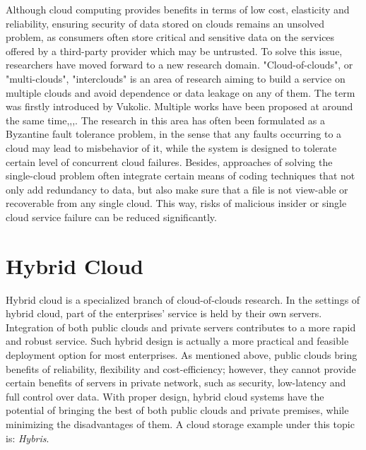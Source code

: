 Although cloud computing provides benefits in terms of low cost, elasticity and reliability, ensuring security of data stored on clouds remains an unsolved problem, as consumers often store critical and sensitive data on the services offered by a third-party provider which may be untrusted. To solve this issue, researchers have moved forward to  a new research domain\cite{aizain2012multiclouds}. "Cloud-of-clouds", or "multi-clouds", "interclouds" is an area of research aiming to build a service on multiple clouds and avoid dependence or data leakage on any of them. The term was firstly introduced by Vukolic\cite{vukolic2010byzantine}. Multiple works have been proposed at around the same time\cite{bowers2009hail},\cite{abu2010racs},\cite{cachin2010dependable},\cite{bessani2013depsky}. The research in this area has often been formulated as a Byzantine fault tolerance problem\cite{lamport1982byzantine}, in the sense that any faults occurring to a cloud may lead to misbehavior of it, while the system is designed to tolerate certain level of concurrent cloud failures. Besides, approaches of solving the single-cloud problem often integrate certain means of coding techniques that not only add redundancy to data, but also make sure that a file is not view-able or recoverable from any single cloud. This way, risks of malicious insider or single cloud service failure can be reduced significantly.

\section{Hybrid Cloud}
\label{s:hybridcloud}

Hybrid cloud is a specialized branch of cloud-of-clouds research. In the settings of hybrid cloud, part of the enterprises' service is held by their own servers. Integration of both public clouds and private servers contributes to a more rapid and robust service. Such hybrid design is actually a more practical and feasible deployment option for most enterprises. As mentioned above, public clouds bring benefits of reliability, flexibility and cost-efficiency; however, they cannot provide certain benefits of servers in private network, such as security, low-latency and full control over data. With proper design, hybrid cloud systems have the potential of bringing the best of both public clouds and private premises, while minimizing the disadvantages of them. A cloud storage example under this topic is: \textit{Hybris}\cite{dobre2014hybris}.

